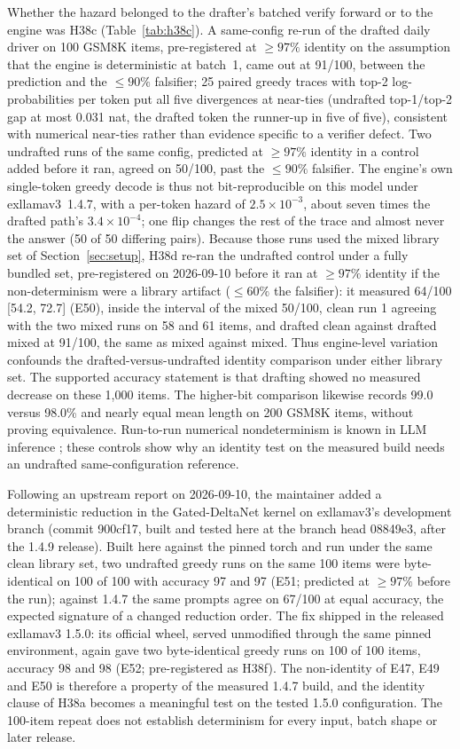 \documentclass[11pt]{article}
\begin{document}
Whether the hazard belonged to the drafter's batched verify forward or to
the engine was H38c (Table~\ref{tab:h38c}). A same-config re-run of the
drafted daily driver on 100 GSM8K items, pre-registered at $\ge97\%$
identity on the assumption that the engine is deterministic at batch~1,
came out at 91/100, between the prediction and the $\le90\%$ falsifier; 25
paired greedy traces with top-2 log-probabilities per token put all five
divergences at near-ties (undrafted top-1/top-2 gap at most 0.031 nat, the
drafted token the runner-up in five of five), consistent with numerical
near-ties rather than evidence specific to a verifier defect. Two undrafted
runs of the same config, predicted at
$\ge97\%$ identity in a control added before it ran, agreed on 50/100, past
the $\le90\%$ falsifier. The engine's own single-token greedy decode is
thus not bit-reproducible on this model under exllamav3~1.4.7, with a
per-token hazard of $2.5\times10^{-3}$, about seven times the drafted
path's $3.4\times10^{-4}$; one flip changes the rest of the trace and
almost never the answer (50 of 50 differing pairs). Because those runs used
the mixed library set of Section~\ref{sec:setup}, H38d re-ran the undrafted
control under a fully bundled set, pre-registered on 2026-09-10 before it
ran at $\ge97\%$ identity if the non-determinism were a library artifact
($\le60\%$ the falsifier): it measured 64/100 [54.2, 72.7] (E50), inside
the interval of the mixed 50/100, clean run 1 agreeing with the two mixed
runs on 58 and 61 items, and drafted clean against drafted mixed at 91/100,
the same as mixed against mixed. Thus engine-level variation confounds the
drafted-versus-undrafted identity comparison under either library set. The
supported accuracy statement is that drafting showed no measured decrease
on these 1,000 items. The higher-bit comparison likewise records 99.0 versus
98.0\% and nearly equal mean length on 200 GSM8K items, without proving
equivalence. Run-to-run numerical nondeterminism is known in LLM inference
\citep{yuan2025nondeterminism}; these controls show why an identity test on
the measured build needs an undrafted same-configuration reference.

Following an upstream report on 2026-09-10, the maintainer added a deterministic reduction in the
Gated-DeltaNet kernel on exllamav3's development branch (commit 900cf17,
built and tested here at the branch head 08849e3, after the 1.4.9 release). Built here against the pinned torch and run under
the same clean library set, two undrafted greedy runs on the same 100 items
were byte-identical on 100 of 100 with accuracy 97 and 97 (E51; predicted at
$\ge97\%$ before the run); against 1.4.7 the same prompts agree on 67/100 at
equal accuracy, the expected signature of a changed reduction order. The fix
shipped in the released exllamav3 1.5.0: its official wheel, served
unmodified through the same pinned environment, again gave two byte-identical
greedy runs on 100 of 100 items, accuracy 98 and 98 (E52; pre-registered as
H38f). The non-identity of E47, E49 and E50 is therefore a property of the
measured 1.4.7 build, and the identity clause of H38a becomes a meaningful
test on the tested 1.5.0 configuration. The 100-item repeat does not establish
determinism for every input, batch shape or later release.
\end{document}
